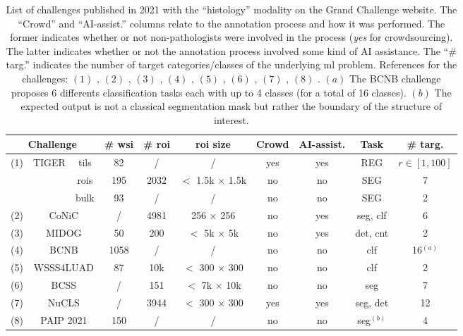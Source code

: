 \begin{table}
  \centering
  \footnotesize
  \begin{tabular}{|ccc|ccccccc|}
    \hline
    \multicolumn{3}{|c|}{Challenge} & \# \acrshort{wsi} & \# \acrshort{roi} & \acrshort{roi} size & Crowd & AI-assist. & Task & \# targ. \\
    \hline
    \multirow{3}{*}{(1)} & \multirow{3}{*}{TIGER} & tils & 82 & / &  / & yes & yes & REG & $r \in \left[1, 100\right]$\\
    & & rois & 195 & 2032 & $<$ 1.5k $\times$ 1.5k & no & no & SEG & 7\\
    & & bulk & 93 & / & / & no & no & SEG & 2 \\
    \hdashline
    (2) & \multicolumn{2}{c|}{CoNiC} & / & 4981 & 256 $\times$ 256 & no & yes & \acrshort{seg}, \acrshort{clf} & 6 \\
    (3) & \multicolumn{2}{c|}{MIDOG} 2021 & 50 & 200 & $<$ 5k $\times$ 5k & no & yes & \acrshort{det}, \acrshort{cnt} & 2 \\
    (4) & \multicolumn{2}{c|}{BCNB} & 1058 & / & / & no & no & \acrshort{clf} & 16$^{(a)}$ \\
    (5) & \multicolumn{2}{c|}{WSSS4LUAD} & 87 & 10k & $<$ 300 $\times$ 300 & no & no & \acrshort{clf} & 2\\
    (6) & \multicolumn{2}{c|}{BCSS} & / & 151 & $<$ 7k $\times$ 10k & no & no & \acrshort{seg} & 7\\
    (7) & \multicolumn{2}{c|}{NuCLS} & / & 3944 & $<$ 300 $\times$ 300 & yes & yes & \acrshort{seg}, \acrshort{det} & 12 \\
    (8) & \multicolumn{2}{c|}{PAIP 2021} & 150 & / & / & no & no & \acrshort{seg}$^{(b)}$ & 4 \\
    \hline
  \end{tabular}
  \caption{List of challenges published in 2021 with the ``histology'' modality on the Grand Challenge website. The ``Crowd'' and 
  ``AI-assist.'' columns relate to the annotation process and how it was performed. The former indicates whether or not non-pathologists 
  were involved in the process (\ie \textit{yes} for crowdsourcing). The latter indicates whether or not the annotation process involved 
  some kind of AI assistance. The ``\# targ.'' indicates the number of target categories/classes of the underlying \acrlong{ml} problem. 
  References for the challenges: $(1)$ \TODO{\cite{}}, $(2)$ \cite{graham2021conic}, $(3)$ \cite{aubreville2021mitosis}, $(4)$ \cite{xu2021predicting}, 
  $(5)$ \cite{han2021multilayer}, $(6)$ \cite{amgad2019structured}, $(7)$ \cite{amgad2021nucls}, $(8)$ \TODO{\cite{}}. $(a)$ The BCNB challenge 
  proposes 6 differents classification tasks each with up to 4 classes (for a total of 16 classes). $(b)$ The expected output is not a 
  classical segmentation mask but rather the boundary of the structure of interest.}
  \label{tab:backdp:datascarcity-grandchallenge}
\end{table}

